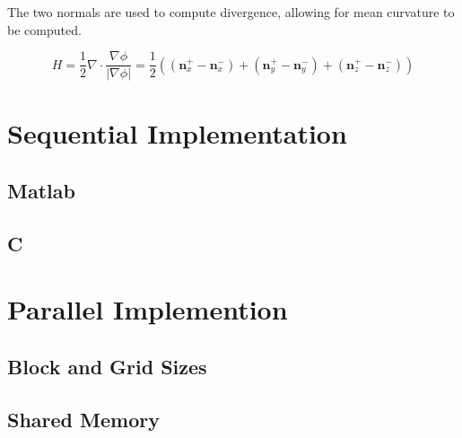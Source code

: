 The two normals are used to compute divergence, allowing for mean curvature to be computed.

\begin{equation}
H = \frac{1}{2}\nabla\cdot\frac{\nabla\phi}{|\nabla\phi|} = \frac{1}{2}((\textbf{n}_x^+ - \textbf{n}_x^-)+(\textbf{n}_y^+ - \textbf{n}_y^-)+(\textbf{n}_z^+ - \textbf{n}_z^-))
\label{eq:curv}
\end{equation}

\section{Sequential Implementation}
	\subsection{Matlab}
	\subsection{C}

\section{Parallel Implemention}
	\subsection{Block and Grid Sizes}
	\subsection{Shared Memory}